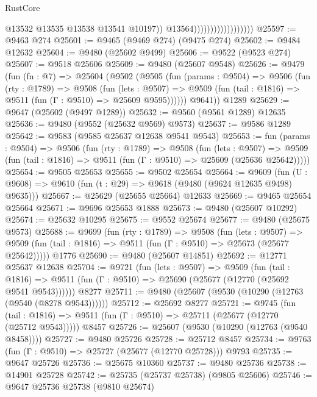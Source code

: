 \begin{lexlean}{RustCore}
\begin{coremodule}
                                            @13532
                                            @13535
                                            @13538
                                            @13541
                                            @10197))
                                        @13564))))))))))))))))))
@25597 := @9463 @274
@25601 := @9465 (@9469 @274) (@9475 @274)
@25602 := @9484 @12632
@25604 := @9480 (@25602 @9499)
@25606 := @9522 (@9523 @274)
@25607 := @9518 @25606
@25609 := @9480 (@25607 @9548)
@25626 := @9479
    (fun (fn : @7) =>
    @25604
      (@9502
        (@9505
          (fun (params : @9504) =>
          @9506
            (fun (rty : @1789) =>
            @9508
              (fun (lets : @9507) =>
              @9509 (fun (tail : @1816) => @9511 (fun (Γ : @9510) => @25609 @9595))))))
        @9641))
    @1289
@25629 := @9647 (@25602 (@9497 @1289))
@25632 := @9560 (@9561 @1289) @12635
@25636 := @9480 (@9552 (@25632 @9569) @9573)
@25637 := @9586 @1289
@25642 := @9583 (@9585 @25637 @12638 @9541 @9543)
@25653 := fun (params : @9504) =>
  @9506
    (fun (rty : @1789) =>
    @9508
      (fun (lets : @9507) =>
      @9509 (fun (tail : @1816) => @9511 (fun (Γ : @9510) => @25609 (@25636 @25642)))))
@25654 := @9505 @25653
@25655 := @9502 @25654
@25664 := @9609
    (fun (U : @9608) => @9610 (fun (t : @29) => @9618 (@9480 (@9624 @12635 @9498) @9635)))
@25667 := @25629 (@25655 @25664) @12633
@25669 := @9465 @25654 @25664
@25671 := @9696 @25653 @1888
@25673 := @9480 (@25607 @10292)
@25674 := @25632 @10295
@25675 := @9552 @25674
@25677 := @9480 (@25675 @9573)
@25688 := @9699
    (fun (rty : @1789) =>
    @9508
      (fun (lets : @9507) =>
      @9509 (fun (tail : @1816) => @9511 (fun (Γ : @9510) => @25673 (@25677 @25642)))))
    @1776
@25690 := @9480 (@25607 @14851)
@25692 := @12771 @25637 @12638
@25704 := @9721
    (fun (lets : @9507) =>
    @9509
      (fun (tail : @1816) =>
      @9511 (fun (Γ : @9510) => @25690 (@25677 (@12770 (@25692 @9541 @9543))))))
    @8277
@25711 := @9480 (@25607 (@9530 (@10290 (@12763 (@9540 (@8278 @9543))))))
@25712 := @25692 @8277
@25721 := @9745
    (fun (tail : @1816) => @9511 (fun (Γ : @9510) => @25711 (@25677 (@12770 (@25712 @9543)))))
    @8457
@25726 := @25607 (@9530 (@10290 (@12763 (@9540 @8458))))
@25727 := @9480 @25726
@25728 := @25712 @8457
@25734 := @9763 (fun (Γ : @9510) => @25727 (@25677 (@12770 @25728))) @9793
@25735 := @9647 @25726
@25736 := @25675 @10360
@25737 := @9480 @25736
@25738 := @14901 @25728
@25742 := @25735 (@25737 @25738) (@9805 @25606)
@25746 := @9647 @25736 @25738 (@9810 @25674)

\end{coremodule}
\end{lexlean}
